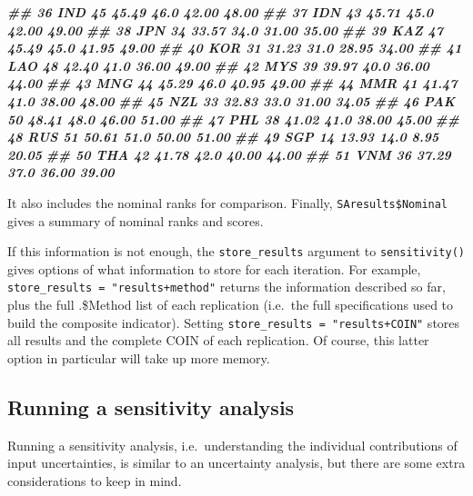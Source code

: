 \documentclass[
]{book}
\newenvironment{Shaded}{\begin{snugshade}}{\end{snugshade}}
\newcommand{\DocumentationTok}[1]{\textcolor[rgb]{0.56,0.35,0.01}{\textbf{\textit{#1}}}}
\begin{document}
\begin{Shaded}
\begin{Highlighting}[]
\DocumentationTok{\#\# 36      IND      45 45.49   46.0 42.00 48.00}
\DocumentationTok{\#\# 37      IDN      43 45.71   45.0 42.00 49.00}
\DocumentationTok{\#\# 38      JPN      34 33.57   34.0 31.00 35.00}
\DocumentationTok{\#\# 39      KAZ      47 45.49   45.0 41.95 49.00}
\DocumentationTok{\#\# 40      KOR      31 31.23   31.0 28.95 34.00}
\DocumentationTok{\#\# 41      LAO      48 42.40   41.0 36.00 49.00}
\DocumentationTok{\#\# 42      MYS      39 39.97   40.0 36.00 44.00}
\DocumentationTok{\#\# 43      MNG      44 45.29   46.0 40.95 49.00}
\DocumentationTok{\#\# 44      MMR      41 41.47   41.0 38.00 48.00}
\DocumentationTok{\#\# 45      NZL      33 32.83   33.0 31.00 34.05}
\DocumentationTok{\#\# 46      PAK      50 48.41   48.0 46.00 51.00}
\DocumentationTok{\#\# 47      PHL      38 41.02   41.0 38.00 45.00}
\DocumentationTok{\#\# 48      RUS      51 50.61   51.0 50.00 51.00}
\DocumentationTok{\#\# 49      SGP      14 13.93   14.0  8.95 20.05}
\DocumentationTok{\#\# 50      THA      42 41.78   42.0 40.00 44.00}
\DocumentationTok{\#\# 51      VNM      36 37.29   37.0 36.00 39.00}
\end{Highlighting}
\end{Shaded}

It also includes the nominal ranks for comparison. Finally, \texttt{SAresults\$Nominal} gives a summary of nominal ranks and scores.

If this information is not enough, the \texttt{store\_results} argument to \texttt{sensitivity()} gives options of what information to store for each iteration. For example, \texttt{store\_results\ =\ "results+method"} returns the information described so far, plus the full .\$Method list of each replication (i.e.~the full specifications used to build the composite indicator). Setting \texttt{store\_results\ =\ "results+COIN"} stores all results and the complete COIN of each replication. Of course, this latter option in particular will take up more memory.

\hypertarget{running-a-sensitivity-analysis}{%
\subsection{Running a sensitivity analysis}\label{running-a-sensitivity-analysis}}

Running a sensitivity analysis, i.e.~understanding the individual contributions of input uncertainties, is similar to an uncertainty analysis, but there are some extra considerations to keep in mind.
\end{document}
